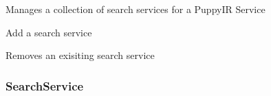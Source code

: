 \documentclass[letterpaper,10pt,english]{sphinxmanual}
\begin{document}
\begin{fulllineitems}
\label{api2.0:puppy.service.ServiceManager}
Manages a collection of search services for a PuppyIR Service

\begin{fulllineitems}
\label{api2.0:puppy.service.ServiceManager.add_search_service}
Add a search service

\end{fulllineitems}


\begin{fulllineitems}
\label{api2.0:puppy.service.ServiceManager.remove_search_service}
Removes an exisiting search service

\end{fulllineitems}


\end{fulllineitems}



\subsubsection{SearchService}
\label{api2.0:searchservice}
\end{document}

